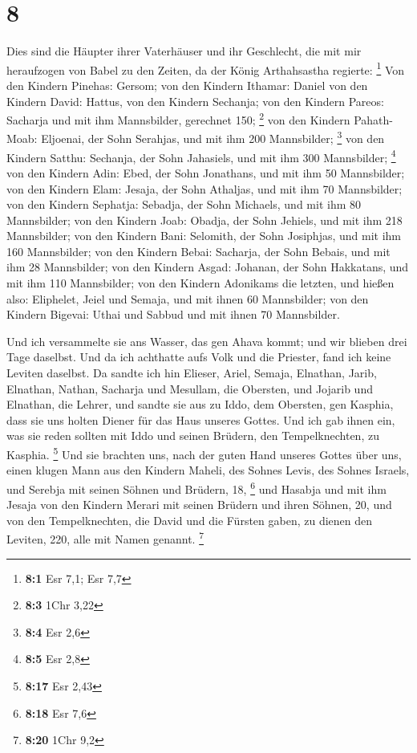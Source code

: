 \hypertarget{section-1}{%
\section{8}\label{section-1}}

 Dies sind die Häupter ihrer Vaterhäuser und ihr Geschlecht,
die mit mir heraufzogen von Babel zu den Zeiten, da der König
Arthahsastha regierte: \footnote{\textbf{8:1} Esr 7,1; Esr 7,7}
 Von den Kindern Pinehas: Gersom; von den Kindern Ithamar:
Daniel von den Kindern David: Hattus,  von den Kindern
Sechanja; von den Kindern Pareos: Sacharja und mit ihm Mannsbilder,
gerechnet 150; \footnote{\textbf{8:3} 1Chr 3,22}  von den
Kindern Pahath-Moab: Eljoenai, der Sohn Serahjas, und mit ihm 200
Mannsbilder; \footnote{\textbf{8:4} Esr 2,6}  von den
Kindern Satthu: Sechanja, der Sohn Jahasiels, und mit ihm 300
Mannsbilder; \footnote{\textbf{8:5} Esr 2,8}  von den
Kindern Adin: Ebed, der Sohn Jonathans, und mit ihm 50 Mannsbilder;
 von den Kindern Elam: Jesaja, der Sohn Athaljas, und mit
ihm 70 Mannsbilder;  von den Kindern Sephatja: Sebadja, der
Sohn Michaels, und mit ihm 80 Mannsbilder;  von den Kindern
Joab: Obadja, der Sohn Jehiels, und mit ihm 218 Mannsbilder;
 von den Kindern Bani: Selomith, der Sohn Josiphjas, und
mit ihm 160 Mannsbilder;  von den Kindern Bebai: Sacharja,
der Sohn Bebais, und mit ihm 28 Mannsbilder;  von den
Kindern Asgad: Johanan, der Sohn Hakkatans, und mit ihm 110 Mannsbilder;
 von den Kindern Adonikams die letzten, und hießen also:
Eliphelet, Jeiel und Semaja, und mit ihnen 60 Mannsbilder; 
von den Kindern Bigevai: Uthai und Sabbud und mit ihnen 70 Mannsbilder.

 Und ich versammelte sie ans Wasser, das gen Ahava kommt;
und wir blieben drei Tage daselbst. Und da ich achthatte aufs Volk und
die Priester, fand ich keine Leviten daselbst.  Da sandte
ich hin Elieser, Ariel, Semaja, Elnathan, Jarib, Elnathan, Nathan,
Sacharja und Mesullam, die Obersten, und Jojarib und Elnathan, die
Lehrer,  und sandte sie aus zu Iddo, dem Obersten, gen
Kasphia, dass sie uns holten Diener für das Haus unseres Gottes. Und ich
gab ihnen ein, was sie reden sollten mit Iddo und seinen Brüdern, den
Tempelknechten, zu Kasphia. \footnote{\textbf{8:17} Esr 2,43}
 Und sie brachten uns, nach der guten Hand unseres Gottes
über uns, einen klugen Mann aus den Kindern Maheli, des Sohnes Levis,
des Sohnes Israels, und Serebja mit seinen Söhnen und Brüdern, 18,
\footnote{\textbf{8:18} Esr 7,6}  und Hasabja und mit ihm
Jesaja von den Kindern Merari mit seinen Brüdern und ihren Söhnen, 20,
 und von den Tempelknechten, die David und die Fürsten
gaben, zu dienen den Leviten, 220, alle mit Namen genannt. \footnote{\textbf{8:20}
  1Chr 9,2}

